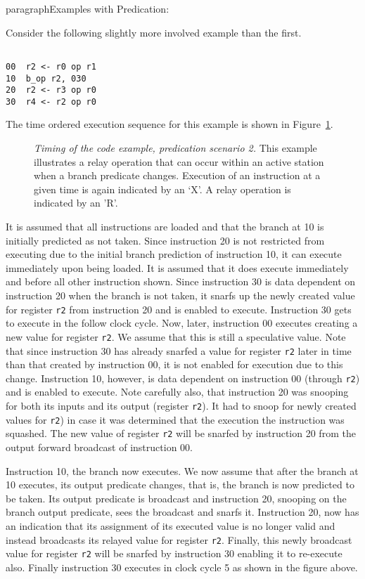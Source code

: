 paragraph{Examples with Predication: }

Consider the following slightly more involved example than the first.

\begin{verbatim}

00	r2 <- r0 op r1
10	b_op r2, 030
20	r2 <- r3 op r0
30	r4 <- r2 op r0

\end{verbatim}

The time ordered execution sequence for this example is shown in
Figure~\ref{pex2}.

\begin{figure}
\centering
{}
\caption{{\em Timing of the code example, predication scenario 2.}
This example illustrates a relay operation that
can occur within an active station when a branch
predicate changes.
Execution of an instruction at a given time is
again indicated by an `X'.  A relay operation is indicated by an 'R'.}
\label{pex2}
\end{figure}

It is assumed that all instructions are loaded and that
the branch at 10 is initially predicted as not taken.
Since instruction 20 is not restricted from executing
due to the initial branch prediction of instruction 10,
it can execute immediately upon being loaded.
It is assumed that it does execute immediately and before
all other instruction shown.
Since instruction 30 is data dependent on instruction 20
when the branch is not taken, it snarfs up the
newly created value for register
{\tt r2}
from instruction 20 and is enabled to execute.
Instruction 30 gets to execute in the follow clock cycle.
Now, later, instruction 00 executes creating a new value for
register
{\tt r2}.
We assume that this is still a speculative value.
Note that since instruction 30 has already snarfed a value for
register
{\tt r2}
later in time than that created by instruction 00, it is not
enabled for execution due to this change.
Instruction 10, however, is data dependent on instruction 00 (through
{\tt r2})
and is enabled to execute.  
Note carefully also, that instruction 20 was snooping for both
its inputs and its output (register
{\tt r2}).  It had to snoop for newly created values for
{\tt r2}) in case it was determined that the execution the instruction
was squashed.  The new value of
register
{\tt r2} will be snarfed by instruction 20 from 
the output forward broadcast of
instruction 00.

Instruction 10, the branch now executes.
We now assume that after the branch at 10 executes, its output
predicate changes, that is, the branch is now predicted to
be taken.  Its output predicate is broadcast and
instruction 20, snooping on the branch output predicate,
sees the broadcast and snarfs it.  Instruction 20, now has
an indication that its assignment of its executed value
is no longer valid and instead broadcasts its relayed value
for register
{\tt r2}.
Finally, this newly broadcast value for
register
{\tt r2} will
be snarfed by instruction 30 enabling it to re-execute also.
Finally instruction 30 executes in clock cycle 5 as shown in the
figure above.

